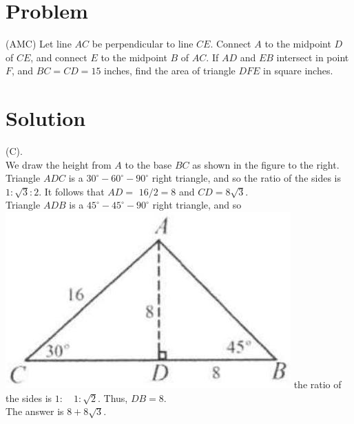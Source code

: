 \documentclass{article}
\begin{document}
\section*{Problem}
(AMC) Let line \(A C\) be perpendicular to line \(C E\). Connect \(A\) to the midpoint \(D\) of \(C E\), and connect \(E\) to the midpoint \(B\) of \(A C\). If \(A D\) and \(E B\) intersect in point \(F\), and \(B C=C D=15\) inches, find the area of triangle \(D F E\) in square inches.

\section*{Solution}
(C).\\
We draw the height from \(A\) to the base \(B C\) as shown in the figure to the right.\\
Triangle \(A D C\) is a \(30^{\circ}-60^{\circ}-90^{\circ}\) right triangle, and so the ratio of the sides is \(1: \sqrt{3}: 2\). It follows that \(A D=\) \(16 / 2=8\) and \(C D=8 \sqrt{3}\).\\
Triangle \(A D B\) is a \(45^{\circ}-45^{\circ}-90^{\circ}\) right triangle, and so\\
\includegraphics[width=\textwidth]{images/092.jpg} the ratio of the sides is \(1: \quad 1: \sqrt{2}\). Thus, \(D B=8\).\\
The answer is \(8+8 \sqrt{3}\).
\end{document}
